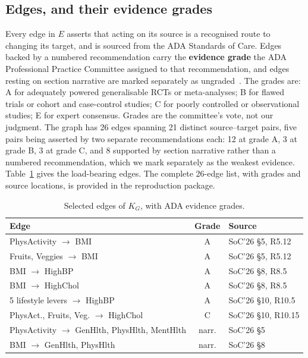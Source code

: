 \documentclass[conference]{IEEEtran}
\begin{document}
\subsection{Edges, and their evidence grades}
Every edge in $E$ asserts that acting on its source is a recognised route to changing its target, and is sourced from the ADA Standards of Care. Edges backed by a numbered recommendation carry the \textbf{evidence grade} the ADA Professional Practice Committee assigned to that recommendation, and edges resting on section narrative are marked separately as ungraded~\cite{ada2026int}. The grades are: A for adequately powered generalisable RCTs or meta-analyses; B for flawed trials or cohort and case-control studies; C for poorly controlled or observational studies; E for expert consensus. Grades are the committee's vote, not our judgment. The graph has 26 edges spanning 21 distinct source--target pairs, five pairs being asserted by two separate recommendations each: 12 at grade A, 3 at grade B, 3 at grade C, and 8 supported by section narrative rather than a numbered recommendation, which we mark separately as the weakest evidence. Table~\ref{tab:edges} gives the load-bearing edges. The complete 26-edge list, with grades and source locations, is provided in the reproduction package.

\begin{table}[t]
\caption{Selected edges of $K_G$, with ADA evidence grades.}
\label{tab:edges}
\centering
\footnotesize
\begin{tabular}{@{}p{2.9cm}cp{2.4cm}@{}}
\toprule
\textbf{Edge} & \textbf{Grade} & \textbf{Source} \\
\midrule
PhysActivity $\rightarrow$ BMI & A & SoC'26 \S5, R5.12 \\
Fruits, Veggies $\rightarrow$ BMI & A & SoC'26 \S5, R5.12 \\
BMI $\rightarrow$ HighBP & A & SoC'26 \S8, R8.5 \\
BMI $\rightarrow$ HighChol & A & SoC'26 \S8, R8.5 \\
5 lifestyle levers $\rightarrow$ HighBP & A & SoC'26 \S10, R10.5 \\
PhysAct., Fruits, Veg. $\rightarrow$ HighChol & C & SoC'26 \S10, R10.15 \\
PhysActivity $\rightarrow$ GenHlth, PhysHlth, MentHlth & narr. & SoC'26 \S5 \\
BMI $\rightarrow$ GenHlth, PhysHlth & narr. & SoC'26 \S8 \\
\bottomrule
\end{tabular}
\end{table}
\end{document}
